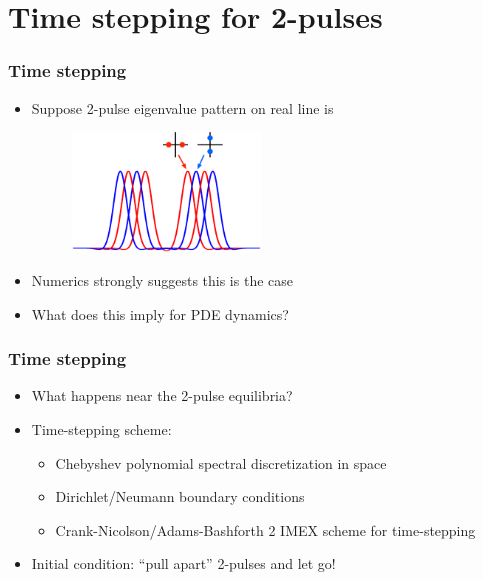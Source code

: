 \documentclass[16pt]{beamer}
\begin{document}
\section{Time stepping for 2-pulses}

\begin{frame}
	\frametitle{Time stepping}
	\fontsize{16}{7.2}\selectfont
	\begin{itemize}
		\item Suppose 2-pulse eigenvalue pattern on real line is 
		\begin{figure}
		\begin{center}
		\includegraphics[width=5cm]{images/DPeigpattern.eps}
		\end{center}
		\end{figure}
		\item Numerics strongly suggests this is the case
		\vspace{0.5cm}
		\item What does this imply for PDE dynamics?
	\end{itemize}
\end{frame}

\begin{frame}
	\frametitle{Time stepping}
	\fontsize{16}{7.2}\selectfont
	\begin{itemize}
		\item What happens near the 2-pulse equilibria?
		\vspace{0.5cm}
		\item Time-stepping scheme:
		\begin{itemize}
			\item Chebyshev polynomial spectral discretization in space
			\item Dirichlet/Neumann boundary conditions
			\item Crank-Nicolson/Adams-Bashforth 2 IMEX scheme for time-stepping
		\end{itemize}
		\vspace{0.5cm}
		\item Initial condition: ``pull apart'' 2-pulses and let go!
	\end{itemize}
\end{frame}
\end{document}
